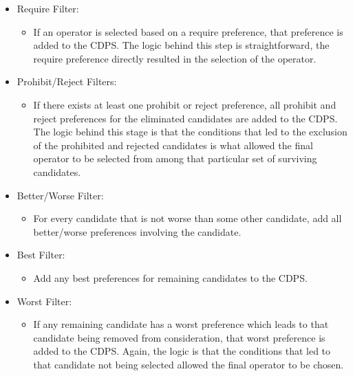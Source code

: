 \begin{itemize}
\item Require Filter: 
\begin{itemize}
\item If an operator is selected based on a require preference, that preference
is added to the CDPS.  The logic behind this step is straightforward, the
require preference directly resulted in the selection of the operator.
\end{itemize}

\item Prohibit/Reject Filters: 
\begin{itemize}
\item If there exists at least one prohibit or reject preference, all prohibit
and reject preferences for the eliminated candidates are added to the CDPS.  The logic
behind this stage is that the conditions that led to the exclusion of the
prohibited and rejected candidates is what allowed the final operator to be
selected from among that particular set of surviving candidates.
\end{itemize}

\item Better/Worse Filter: 
\begin{itemize}
\item For every candidate that is not worse than some other candidate, add all better/worse preferences involving the candidate.
\end{itemize}

\item Best Filter: 
\begin{itemize}
\item Add any best preferences for remaining candidates to the CDPS. 
\end{itemize}

\item Worst Filter:
\begin{itemize}
\item If any remaining candidate has a worst preference which leads to that
candidate being removed from consideration, that worst preference is added to
the CDPS.  Again, the logic is that the conditions that led to
that candidate not being selected allowed the final operator to be chosen.
\end{itemize}


\end{itemize}
